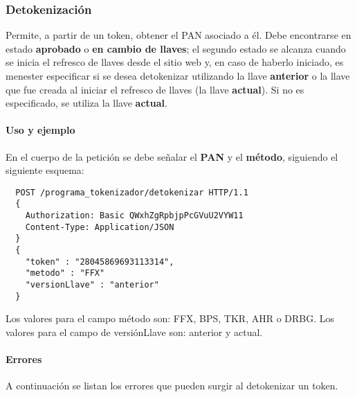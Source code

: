 \subsubsection{Detokenización}

Permite, a partir de un token, obtener el PAN asociado a él.
Debe encontrarse en estado \textbf{aprobado} o \textbf{en cambio de llaves};
el segundo estado se alcanza cuando se inicia el refresco de llaves desde
el sitio web y, en caso de haberlo iniciado, es menester especificar si se
desea detokenizar utilizando la llave \textbf{anterior} o la llave que fue
creada al iniciar el refresco de llaves (la llave \textbf{actual}). Si no
es especificado, se utiliza la llave \textbf{actual}.

\paragraph{Uso y ejemplo}

En el cuerpo de la petición se debe señalar el \textbf{PAN} y el
\textbf{método}, siguiendo el siguiente esquema:

\begin{verbatim}
  POST /programa_tokenizador/detokenizar HTTP/1.1
  {
    Authorization: Basic QWxhZgRpbjpPcGVuU2VYW11
    Content-Type: Application/JSON
  }
  {
    "token" : "28045869693113314",
    "metodo" : "FFX"
    "versionLlave" : "anterior"
  }
\end{verbatim}

Los valores para el campo método son: FFX, BPS, TKR, AHR o DRBG. Los valores
para el campo de versiónLlave son: anterior y actual.

\paragraph{Errores}

A continuación se listan los errores que pueden surgir al detokenizar un
token.

